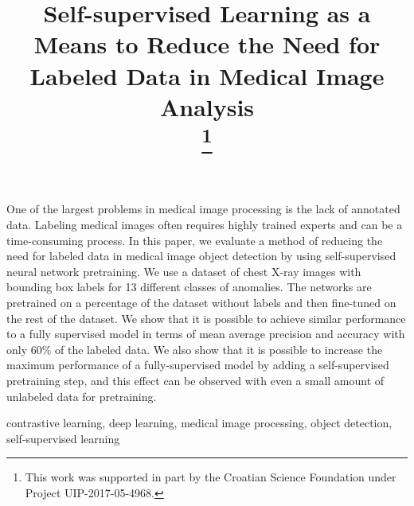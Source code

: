 \documentclass[conference]{IEEEtran}
\begin{document}
\title{Self-supervised Learning as a Means to Reduce the Need for Labeled Data in Medical Image Analysis\\
\thanks{This work was supported in part by the Croatian Science Foundation under Project UIP-2017-05-4968.}
}

\author{ 
}

\maketitle

\begin{abstract}
\end{abstract}
One of the largest problems in medical image processing is the lack of annotated data. Labeling 
medical images often requires highly trained experts and can be a time-consuming process. In this 
paper, we evaluate a method of reducing the need for labeled data in medical image object detection 
by using self-supervised neural network pretraining. We use a dataset of chest X-ray 
images with bounding box labels for 13 different classes of anomalies. The networks are pretrained 
on a percentage of the dataset without labels and then fine-tuned on the rest of the dataset. We 
show that it is possible to achieve similar performance to a fully supervised model in terms of mean average 
precision and accuracy with only 60\% of the labeled data. We also show 
that it is possible to increase the maximum performance of a fully-supervised model by adding a 
self-supervised pretraining step, and this effect can be observed with even a small amount of 
unlabeled data for pretraining.

\begin{IEEEkeywords}
contrastive learning, deep learning, medical image processing, object detection, self-supervised learning
\end{IEEEkeywords}
\end{document}
